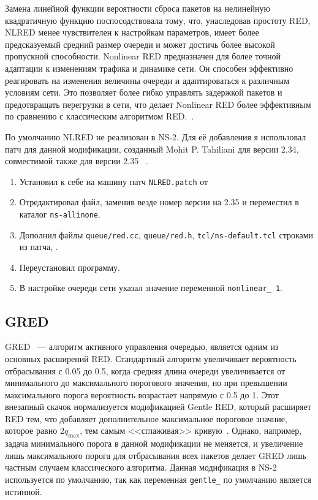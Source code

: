 Замена линейной функции вероятности сброса пакетов на нелинейную квадратичную функцию поспосодствовала тому, что,
унаследовав простоту RED, NLRED менее чувствителен к настройкам параметров, имеет более предсказуемый средний размер очереди 
и может достичь более высокой пропускной способности. Nonlinear RED предназначен для более точной адаптации к изменениям трафика и динамике сети. 
Он способен эффективно реагировать на изменения величины очереди и адаптироваться к различным условиям сети. 
Это позволяет более гибко управлять задержкой пакетов и предотвращать перегрузки в сети, 
что делает Nonlinear RED более эффективным по сравнению с классическим алгоритмом RED.~\cite{NLRED1}.  



По умолчанию NLRED не реализован в NS-2. Для её добавления я использовал патч для данной модификации, созданный Mohit
  P. Tahiliani для версии 2.34, совместимой также для версии 2.35 ~\cite{nlredpatch}. 
  
\begin{enumerate}
\item Установил к себе на машину патч \verb|NLRED.patch| от 
\item Отредактировал файл, заменив везде номер версии на 2.35 и переместил в каталог \verb|ns-allinone|.
\item Дополнил файлы \verb|queue/red.cc|, \verb|queue/red.h|, \verb|tcl/ns-default.tcl| строками из патча, .
\item Переустановил программу.
\item В настройке очереди сети указал значение переменной \verb|nonlinear_ 1|.
\end{enumerate}

\subsection{GRED}

GRED ~--- алгоритм активного управления очередью,
является одним из основных расширений RED. Стандартный алгоритм увеличивает
вероятность отбрасывания с 0.05 до 0.5, когда средняя длина очереди
увеличивается от минимального до максимального порогового значения, но
при превышении максимального порога вероятность возрастает напрямую с
0.5 до 1.  Этот внезапный скачок нормализуется модификацией Gentle
RED, который расширяет RED тем, что добавляет дополнительное
максимальное пороговое значние, которое равно $2q_{\max}$, тем самым
<<сглаживая>> кривую~\cite{GRED}. Однако, например, задача минимального порога в данной модификации не меняется, 
и увеличение лишь максимального порога для отбрасывания всех пакетов делает GRED лишь частным случаем классического алгоритма. 
Данная модификация в NS-2 используется по умолчанию, так как переменная \verb|gentle_| по умолчанию 
является истинной. 

